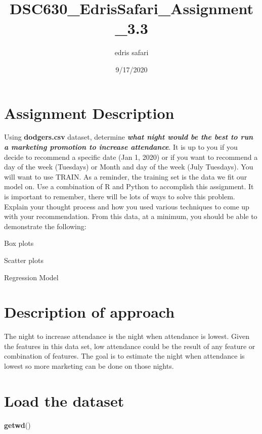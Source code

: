\documentclass[
]{article}
\title{DSC630\_EdrisSafari\_Assignment\_3.3}
\author{edris safari}
\date{9/17/2020}
\newenvironment{Shaded}{\begin{snugshade}}{\end{snugshade}}
\newcommand{\KeywordTok}[1]{\textcolor[rgb]{0.13,0.29,0.53}{\textbf{#1}}}
\newcommand{\NormalTok}[1]{#1}
\begin{document}
\maketitle

\hypertarget{assignment-description}{%
\section{Assignment Description}\label{assignment-description}}

Using \textbf{dodgers.csv} dataset, determine \textbf{\emph{what night
would be the best to run a marketing promotion to increase attendance}}.
It is up to you if you decide to recommend a specific date (Jan 1, 2020)
or if you want to recommend a day of the week (Tuesdays) or Month and
day of the week (July Tuesdays). You will want to use TRAIN. As a
reminder, the training set is the data we fit our model on. Use a
combination of R and Python to accomplish this assignment. It is
important to remember, there will be lots of ways to solve this problem.
Explain your thought process and how you used various techniques to come
up with your recommendation. From this data, at a minimum, you should be
able to demonstrate the following:

Box plots

Scatter plots

Regression Model

\hypertarget{description-of-approach}{%
\section{Description of approach}\label{description-of-approach}}

The night to increase attendance is the night when attendance is lowest.
Given the features in this data set, low attendance could be the result
of any feature or combination of features. The goal is to estimate the
night when attendance is lowest so more marketing can be done on those
nights.

\hypertarget{load-the-dataset}{%
\section{Load the dataset}\label{load-the-dataset}}

\begin{Shaded}
\begin{Highlighting}[]
\KeywordTok{getwd}\NormalTok{()}
\end{Highlighting}
\end{Shaded}
\end{document}
